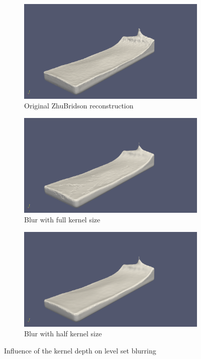 \begin{figure}
        \begin{subfigure}[b]{0.9\textwidth}
               \includegraphics[width=\textwidth]{figures/KernelDepthOriginalReconstruction.png}
               \caption{Original ZhuBridson reconstruction}
               \label{fig:kd_original}
        \end{subfigure}
        \begin{subfigure}[b]{0.9\textwidth}
               \includegraphics[width=\textwidth]{figures/KernelDepth1.png}
               \caption{Blur with full kernel size}
				\label{fig:kd_full}
        \end{subfigure}
        \begin{subfigure}[b]{0.9\textwidth}
               \includegraphics[width=\textwidth]{figures/KernelDepth0_5.png}
               \caption{Blur with half kernel size}
               \label{fig:kd_half}
        \end{subfigure}

       \caption{Influence of the kernel depth on level set blurring}
       \label{fig:kd_influence example}
 \end{figure}
